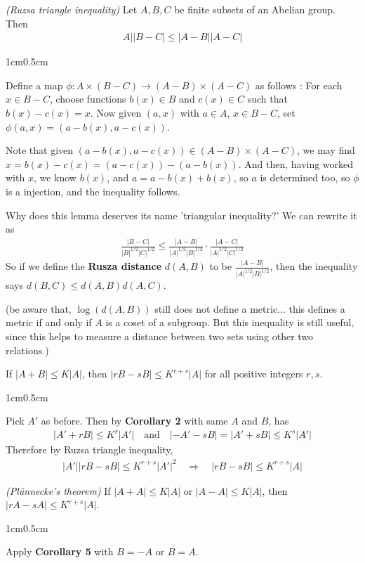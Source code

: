 \documentclass[12pt,a4paper]{report}
\newenvironment{proof}
{\begin{changemargin}{1cm}{0.5cm}
	}%
	{\end{changemargin}
}
\begin{document}
 \emph{(Ruzsa triangle inequality)} Let $A,B,C$ be finite subsets of an Abelian group. Then 
\begin{align*}
A||B-C| \leq |A-B||A-C|
\end{align*}
\begin{proof}
\pf  Define a map $\phi : A \times (B-C) \rightarrow (A-B) \times (A-C)$ as follows : For each $x \in B-C$, choose functions $b(x)\in B$ and $c(x) \in C$ such that $b(x) - c(x) =x$. Now given $(a,x)$ with $a\in A$, $x\in B-C$, set $\phi(a,x) = (a-b(x), a-c(x))$.

\quad Note that given $(a-b(x), a-c(x))\in (A-B)\times (A-C)$, we may find $x = b(x)-c(x) = (a-c(x))- (a-b(x))$. And then, having worked with $x$, we know $b(x)$, and $a = a-b(x)+b(x)$, so $a$ is determined too, so $\phi$ is a injection, and the inequality follows.

\eop
\end{proof}
\s

Why does this lemma deserves its name 'triangular inequality?' We can rewrite it as
\begin{align*}
\frac{|B-C|}{|B|^{1/2} |C|^{1/2}} \leq \frac{|A-B|}{|A|^{1/2}|B|^{1/2}} \cdot \frac{|A-C|}{|A|^{1/2}|C|^{1/2}}
\end{align*}
So if we define the \textbf{Rusza distance} $d(A,B)$ to be $\frac{|A-B|}{|A|^{1/2}|B|^{1/2}}$, then the inequality says $d(B,C) \leq d(A,B)d(A,C)$.

(be aware that, $\log(d(A,B))$ still does not define a metric... this defines a metric if and only if $A$ is a coset of a subgroup. But this inequality is still useful, since this helps to measure a distance between two sets using other two relations.)
\s

 If $|A+B| \leq K|A|$, then $|rB-sB| \leq K^{r+s}|A|$ for all positive integers $r,s$.
\begin{proof}
\pf Pick $A'$ as before. Then by \textbf{Corollary 2} with same $A$ and $B$, has
\begin{align*}
|A'+ rB| \leq K^r |A'| \quad \text{and} \quad |-A'-sB|=|A'+sB|\leq K^s |A'|
\end{align*}
Therefore by Ruzsa triangle inequality,
\begin{align*}
|A'||rB-sB| \leq K^{r+s} |A'|^2 \quad \Rightarrow \quad |rB-sB| \leq K^{r+s}|A|
\end{align*}

\eop
\end{proof}
\s

 \emph{(Pl\"{u}nnecke's theorem)} If $|A+A| \leq K|A|$ or $|A-A| \leq K|A|$, then $|rA-sA| \leq K^{r+s} |A|$.
\begin{proof}
\pf Apply \textbf{Corollary 5} with $B= -A$ or $B=A$.

\eop
\end{proof}
\s
\end{document}
